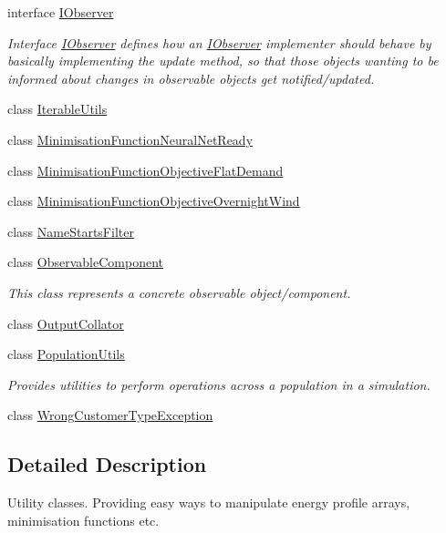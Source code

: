 \begin{DoxyCompactItemize}
interface \hyperlink{interfaceuk_1_1ac_1_1dmu_1_1iesd_1_1cascade_1_1util_1_1_i_observer}{I\-Observer}
\begin{DoxyCompactList}\small\item\em Interface {\ttfamily \hyperlink{interfaceuk_1_1ac_1_1dmu_1_1iesd_1_1cascade_1_1util_1_1_i_observer}{I\-Observer}} defines how an \hyperlink{interfaceuk_1_1ac_1_1dmu_1_1iesd_1_1cascade_1_1util_1_1_i_observer}{I\-Observer} implementer should behave by basically implementing the update method, so that those objects wanting to be informed about changes in observable objects get notified/updated. \end{DoxyCompactList}\item 
class \hyperlink{classuk_1_1ac_1_1dmu_1_1iesd_1_1cascade_1_1util_1_1_iterable_utils}{Iterable\-Utils}
\item 
class \hyperlink{classuk_1_1ac_1_1dmu_1_1iesd_1_1cascade_1_1util_1_1_minimisation_function_neural_net_ready}{Minimisation\-Function\-Neural\-Net\-Ready}
\item 
class \hyperlink{classuk_1_1ac_1_1dmu_1_1iesd_1_1cascade_1_1util_1_1_minimisation_function_objective_flat_demand}{Minimisation\-Function\-Objective\-Flat\-Demand}
\item 
class \hyperlink{classuk_1_1ac_1_1dmu_1_1iesd_1_1cascade_1_1util_1_1_minimisation_function_objective_overnight_wind}{Minimisation\-Function\-Objective\-Overnight\-Wind}
\item 
class \hyperlink{classuk_1_1ac_1_1dmu_1_1iesd_1_1cascade_1_1util_1_1_name_starts_filter}{Name\-Starts\-Filter}
\item 
class \hyperlink{classuk_1_1ac_1_1dmu_1_1iesd_1_1cascade_1_1util_1_1_observable_component}{Observable\-Component}
\begin{DoxyCompactList}\small\item\em This class represents a concrete observable object/component. \end{DoxyCompactList}\item 
class \hyperlink{classuk_1_1ac_1_1dmu_1_1iesd_1_1cascade_1_1util_1_1_output_collator}{Output\-Collator}
\item 
class \hyperlink{classuk_1_1ac_1_1dmu_1_1iesd_1_1cascade_1_1util_1_1_population_utils}{Population\-Utils}
\begin{DoxyCompactList}\small\item\em Provides utilities to perform operations across a population in a simulation. \end{DoxyCompactList}\item 
class \hyperlink{classuk_1_1ac_1_1dmu_1_1iesd_1_1cascade_1_1util_1_1_wrong_customer_type_exception}{Wrong\-Customer\-Type\-Exception}
\end{DoxyCompactItemize}


\subsection{Detailed Description}
Utility classes. Providing easy ways to manipulate energy profile arrays, minimisation functions etc. 